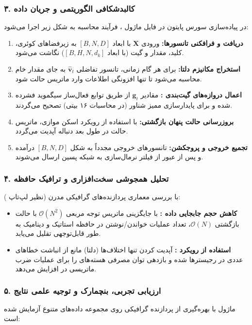 \subsubsection*{۳. کالبدشکافی الگوریتمی و جریان داده }
در پیاده‌سازی سورس پایتون در فایل ماژول ، فرآیند محاسبه به شکل زیر اجرا می‌شود:
\begin{enumerate}
\item \textbf{دریافت و فرافکنی تانسورها:} ورودی $\mathbf{X}$ با ابعاد $[B, N, D]$ به زیرفضاهای کوئری، کلید، مقدار و گیت (با ابعاد $[B, H, N, d_k]$) نگاشت می‌شود.
\item \textbf{استخراج مکانیزم دلتا:} برای هر گام زمانی، تانسور تفاضلی $\hat{\mathbf{v}}_t$ به جای مقدار خام محاسبه می‌شود تا تنها افزونگی اطلاعات وارد ماتریس حالت شود.
\item \textbf{اعمال دروازه‌های گیت‌بندی :} مقادیر $\mathbf{g}_t$ از طریق توابع فعال‌ساز سیگموید فشرده شده و برای پایدارسازی ممیز شناور (در محاسبات ۱۶ بیتی) تصحیح می‌گردند.
\item \textbf{بروزرسانی حالت پنهان بازگشتی:} با استفاده از رویکرد اسکن موازی، ماتریس حالت در طول بعد دنباله آپدیت می‌گردد.
\item \textbf{تجمیع خروجی و پروجکشن:} تانسورهای خروجی مجدداً به شکل $[B, N, D]$ درآمده و پس از عبور از فیلتر نرمال‌سازی به شبکه پسین ارسال می‌شوند.
\end{enumerate}

\subsubsection*{۴. تحلیل همجوشی سخت‌افزاری و ترافیک حافظه }
با بررسی معماری پردازنده‌های گرافیکی مدرن (نظیر لپ‌تاپ ):
\begin{itemize}
\item \textbf{کاهش حجم جابجایی داده :} با جایگزینی ماتریس توجه مربعی $\mathcal{O}(N^2)$ با حالت بازگشتی $\mathcal{O}(N)$، تعداد عملیات خواندن/نوشتن در حافظه استاتیک و دینامیک به طور قابل‌توجهی تقلیل می‌یابد.
\item \textbf{استفاده از رویکرد :} آپدیت کردن تنها اختلاف‌ها (دلتا) مانع از انباشت خطاهای عددی در رجیسترها شده و بازدهی توان مصرفی هسته‌های  را برای عملیات ضرب ماتریسی در  افزایش می‌دهد.
\end{itemize}

\subsubsection*{۵. ارزیابی تجربی، بنچمارک و توجیه علمی نتایج}
ماژول  با بهره‌گیری از پردازنده گرافیکی  روی مجموعه داده‌های متنوع آزمایش شده است:

